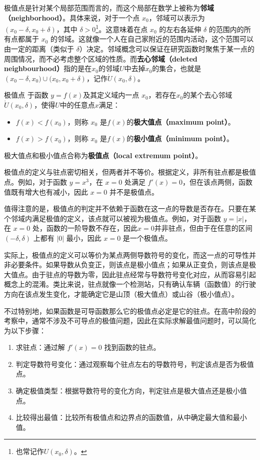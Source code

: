 极值点是针对某个局部范围而言的，而这个局部在数学上被称为\textbf{邻域（neighborhood）}。具体来说，对于一个点 $x_0$，邻域可以表示为 $\left( x_0 - \delta, x_0 + \delta \right)$，其中 $\delta > 0$\footnote{也常记作${U}(x_0, \delta)$。}。这意味着在点 $x_0$ 的左右各延伸 $\delta$ 的范围内的所有点都属于 $x_0$ 的邻域。这就像一个人在自己家附近的范围内活动，这个范围可以由一定的距离（类似于 $\delta$）决定。邻域概念可以保证在研究函数时聚焦于某一点的周围情况，而不必考虑整个区域的性质。而\textbf{去心邻域（deleted neighbourhood）}指的是在$x_0$的邻域$U$中去掉$x_0$的集合，也就是$\left( x_0 - \delta,x_0)\cup(x_0, x_0 + \delta \right)$，记作$\mathring{U}(x_0,\delta)$。

\begin{definition}{极值点}
于函数 $y=f(x)$及其定义域内一点 $x_0$，若存在$x_0$的某个去心邻域$\mathring{U}(x_0,\delta)$，使得$U$中的任意点$x$满足：
\begin{itemize}
\item $f(x) < f\left(x_0\right)$，则称 $x_0$ 是$f(x)$的\textbf{极大值点（maximum point）}。
\item $f(x) > f\left(x_0\right)$，则称 $x_0$ 是$f(x)$的\textbf{极小值点（minimum point）}。
\end{itemize}
极大值点和极小值点合称为\textbf{极值点（local extremum point）}。
\end{definition}

极值点的定义与驻点密切相关，但两者并不等价。根据定义，非所有驻点都是极值点。例如，对于函数 $y = x^3$，在 $x = 0$ 处满足 $f'(x) = 0$，但在该点两侧，函数值既有增大也有减小，因此 $x = 0$ 并不是极值点。

值得注意的是，极值点的判定并不依赖于函数在这一点的导数是否存在。只要在某个邻域内满足极值的定义，该点就可以被视为极值点。例如，对于函数 $y = |x|$，在 $x = 0$ 处，函数的一阶导数不存在，因此$x = 0$并非驻点，但由于在任意的区间 $(-\delta, \delta)$ 上都有 $|0|$ 最小，因此 $x = 0$ 是一个极值点。

实际上，极值点的定义可以等价为某点两侧导数符号的变化，而这一点的可导性并非必要条件。如果导数从负变正，则该点是极小值点；如果从正变负，则该点是极大值点。由于驻点的导数为零，因此驻点经常与导数符号变化对应，从而容易引起概念上的混淆。类比来说，驻点就像一个检测站，只有确认车辆（函数值）的行驶方向在该点发生变化，才能确定它是山顶（极大值点）或山谷（极小值点）。

不过特别地，如果函数是可导函数那么它的极值点必定是它的驻点。在高中阶段的考察中，通常不涉及不可导点的极值问题，因此在实际求解最值问题时，可以简化为以下步骤：
\begin{enumerate}
\item 求驻点：通过解 $f'(x) = 0$ 找到函数的驻点。
\item 判定导数符号变化：通过观察每个驻点左右的导数符号，判定该点是否为极值点。
\item 确定极值类型：根据导数符号的变化方向，判定驻点是极大值点还是极小值点。
\item 比较得出最值：比较所有极值点和边界点的函数值，从中确定最大值和最小值。
\end{enumerate}


